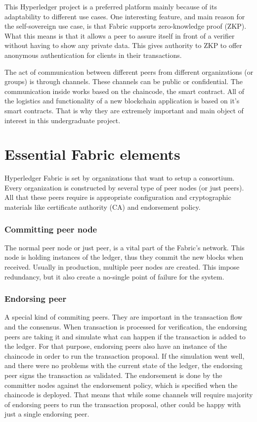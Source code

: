 \documentclass[a4paper,11pt]{report}
\begin{document}
	This Hyperledger project is a preferred platform mainly because of its adaptability to different use cases. One interesting feature, and main reason for the self-sovereign use case, is that Fabric supports zero-knowledge proof (ZKP). What this means is that it allows a peer to assure itself in front of a verifier without having to show any private data. This gives authority to ZKP to offer anonymous authentication for clients in their transactions. \cite{li2018fppb}
	
	The act of communication between different peers from different organizations (or groups) is through channels. These channels can be public or confidential. The communication inside works based on the chaincode, the smart contract. All of the logistics and functionality of a new blockchain application is based on it’s smart contracts. That is why they are extremely important and main object of interest in this undergraduate project.
\section{Essential Fabric elements}
\label{felements}
Hyperledger Fabric is set by organizations that want to setup a consortium. Every organization is constructed by several type of peer nodes (or just peers). All that these peers require is appropriate configuration and cryptographic materials like certificate authority (CA) and endorsement policy.
\subsubsection{Committing peer node}
The normal peer node or just peer, is a vital part of the Fabric’s network. This node is holding instances of the ledger, thus they commit the new blocks when received. Usually in production, multiple peer nodes are created. This impose redundancy, but it also create a no-single point of failure for the system. 
\subsubsection{Endorsing peer}
A special kind of commiting peers. They are important in the transaction flow and the consensus. When transaction is processed for verification, the endorsing peers are taking it and simulate what can happen if the transaction is added to the ledger. For that purpose, endorsing peers also have an instance of the chaincode in order to run the transaction proposal. If the simulation went well, and there were no problems with the current state of the ledger, the endorsing peer signs the transaction as validated. The endorsement is done by the committer nodes against the endorsement policy, which is specified when the chaincode is deployed. That means that while some channels will require majority of endorsing peers to run the transaction proposal, other could be happy with just a single endorsing peer.
\end{document}
